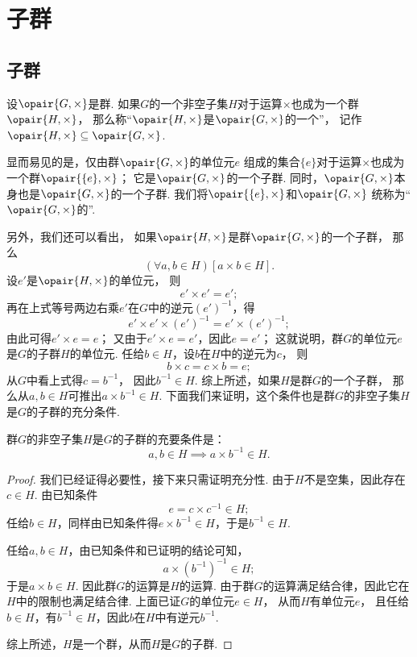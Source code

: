\section{子群}
\subsection{子群}
\begin{definition}
设\(\opair{G,\times}\)是群.
如果\(G\)的一个非空子集\(H\)对于运算\(\times\)也成为一个群\(\opair{H,\times}\)，
那么称“\(\opair{H,\times}\)是\(\opair{G,\times}\)的一个”，
记作\(\opair{H,\times} \subseteq \opair{G,\times}\).
\end{definition}

显而易见的是，仅由群\(\opair{G,\times}\)的单位元\(e\)%
组成的集合\(\{e\}\)对于运算\(\times\)也成为一个群\(\opair{\{e\},\times}\)；
它是\(\opair{G,\times}\)的一个子群.
同时，\(\opair{G,\times}\)本身也是\(\opair{G,\times}\)的一个子群.
我们将\(\opair{\{e\},\times}\)和\(\opair{G,\times}\)%
统称为“\(\opair{G,\times}\)的”.

另外，我们还可以看出，
如果\(\opair{H,\times}\)是群\(\opair{G,\times}\)的一个子群，
那么\[
	(\forall a,b \in H)[a \times b \in H].
\]
设\(e'\)是\(\opair{H,\times}\)的单位元，
则\[
	e' \times e' = e';
\]
再在上式等号两边右乘\(e'\)在\(G\)中的逆元\((e')^{-1}\)，得\[
	e' \times e' \times (e')^{-1} = e' \times (e')^{-1};
\]
由此可得\(e' \times e = e\)；
又由于\(e' \times e = e'\)，因此\(e = e'\)；
这就说明，群\(G\)的单位元\(e\)是\(G\)的子群\(H\)的单位元.
任给\(b \in H\)，设\(b\)在\(H\)中的逆元为\(c\)，
则\[
	b \times c = c \times b = e;
\]
从\(G\)中看上式得\(c = b^{-1}\)，
因此\(b^{-1} \in H\).
综上所述，如果\(H\)是群\(G\)的一个子群，
那么从\(a,b \in H\)可推出\(a \times b^{-1} \in H\).
下面我们来证明，这个条件也是群\(G\)的非空子集\(H\)是\(G\)的子群的充分条件.
\begin{theorem}
群\(G\)的非空子集\(H\)是\(G\)的子群的充要条件是：\[
	a,b \in H \implies a \times b^{-1} \in H.
\]
\begin{proof}
我们已经证得必要性，接下来只需证明充分性.
由于\(H\)不是空集，因此存在\(c \in H\).
由已知条件\[
	e = c \times c^{-1} \in H;
\]
任给\(b \in H\)，同样由已知条件得\(e \times b^{-1} \in H\)，于是\(b^{-1} \in H\).

任给\(a,b \in H\)，由已知条件和已证明的结论可知，\[
	a \times (b^{-1})^{-1} \in H;
\]于是\(a \times b \in H\).
因此群\(G\)的运算是\(H\)的运算.
由于群\(G\)的运算满足结合律，因此它在\(H\)中的限制也满足结合律.
上面已证\(G\)的单位元\(e \in H\)，
从而\(H\)有单位元\(e\)，
且任给\(b \in H\)，有\(b^{-1} \in H\)，因此\(b\)在\(H\)中有逆元\(b^{-1}\).

综上所述，\(H\)是一个群，从而\(H\)是\(G\)的子群.
\end{proof}
\end{theorem}

